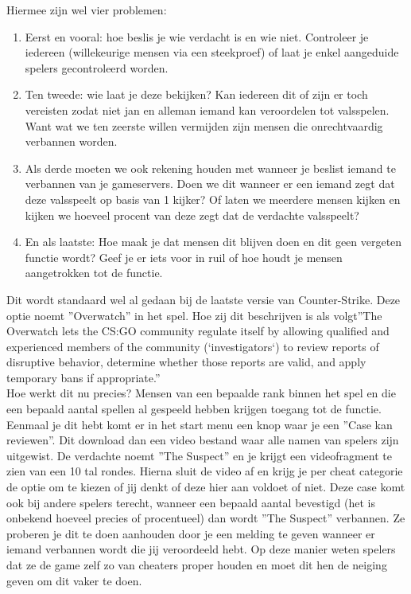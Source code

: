 \documentclass[pdftex,a4paper,12pt,twoside]{report}
\begin{document}
Hiermee zijn wel vier problemen:
\begin{enumerate}  
\item Eerst en vooral: hoe beslis je wie verdacht is en wie niet. Controleer je iedereen (willekeurige mensen via een steekproef) of laat je enkel aangeduide spelers gecontroleerd worden.
\item Ten tweede: wie laat je deze bekijken? Kan iedereen dit of zijn er toch vereisten zodat niet jan en alleman iemand kan veroordelen tot valsspelen. Want wat we ten zeerste willen vermijden zijn mensen die onrechtvaardig verbannen worden.
\item Als derde moeten we ook rekening houden met wanneer je beslist iemand te verbannen van je gameservers. Doen we dit wanneer er een iemand zegt dat deze valsspeelt op basis van 1 kijker? Of laten we meerdere mensen kijken en kijken we hoeveel procent van deze zegt dat de verdachte valsspeelt?
\item En als laatste: Hoe maak je dat mensen dit blijven doen en dit geen vergeten functie wordt? Geef je er iets voor in ruil of hoe houdt je mensen aangetrokken tot de functie.
\end{enumerate}

Dit wordt standaard wel al gedaan bij de laatste versie van Counter-Strike. Deze optie noemt ''Overwatch'' in het spel.
Hoe zij dit beschrijven is als volgt''The Overwatch lets the CS:GO community regulate itself by allowing qualified and experienced members of the community (‘investigators‘) to review reports of disruptive behavior, determine whether those reports are valid, and apply temporary bans if appropriate.'' \citep{overwatch}
\\

Hoe werkt dit nu precies? Mensen van een bepaalde rank binnen het spel en die een bepaald aantal spellen al gespeeld hebben krijgen toegang tot de functie. Eenmaal je dit hebt komt er in het start menu een knop waar je een ''Case kan reviewen''. Dit download dan een video bestand waar alle namen van spelers zijn uitgewist. De verdachte noemt ''The Suspect'' en je krijgt een videofragment te zien van een 10 tal rondes. Hierna sluit de video af en krijg je per \gls{cheat} categorie de optie om te kiezen of jij denkt of deze hier aan voldoet of niet. Deze case komt ook bij andere spelers terecht, wanneer een bepaald aantal bevestigd (het is onbekend hoeveel precies of procentueel) dan wordt ''The Suspect'' verbannen. Ze proberen je dit te doen aanhouden door je een melding te geven wanneer er iemand verbannen wordt die jij veroordeeld hebt. Op deze manier weten spelers dat ze de game zelf zo van \gls{cheat}ers proper houden en moet dit hen de neiging geven om dit vaker te doen.
\\
\end{document}
